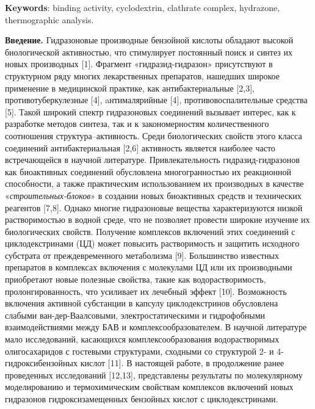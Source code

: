 {\bfseries Keywords}: binding activity, cyclodextrin, clathrate complex,
hydrazone, thermographic analysis.

\begin{multicols}{2}
{\bfseries Введение.} Гидразоновые производные бензойной кислоты обладают
высокой биологической активностью, что стимулирует постоянный поиск и
синтез их новых производных {[}1{]}. Фрагмент «гидразид-гидразон»
присутствуют в структурном ряду многих лекарственных препаратов,
нашедших широкое применение в медицинской практике, как
антибактериальные {[}2,3{]}, противотуберкулезные {[}4{]},
aнтималярийные {[}4{]}, противовоспалительные средства {[}5{]}. Такой
широкий спектр гидразоновых соединений вызывает интерес, как к
разработке методов синтеза, так и к закономерностям количественного
соотношения структура--активность. Среди биологических свойств этого
класса соединений антибактериальная {[}2,6{]} активность является
наиболее часто встречающейся в научной литературе. Привлекательность
гидразид-гидразонов как биоактивных соединений обусловлена
многогранностью их реакционной способности, а также практическим
использованием их производных в качестве «\emph{строительных-блоков}» в
создании новых биоактивных средств и технических реагентов {[}7,8{]}.
Однако многие гидразоновые вещества характеризуются низкой
растворимостью в водной среде, что не позволяет провести широкие
изучение их биологических свойств. Получение комплексов включений этих
соединений с циклодекстринами (ЦД) может повысить растворимость и
защитить исходного субстрата от преждевременного метаболизма {[}9{]}.
Большинство известных препаратов в комплексах включения с молекулами ЦД
или их производными приобретают новые полезные свойства, такие как
водорастворимость, пролонгированность, что усиливает их лечебный эффект
{[}10{]}. Возможность включения активной субстанции в капсулу
циклодекстринов обусловлена слабыми ван-дер-Ваалсовыми,
электростатическими и гидрофобными взаимодействиями между БАВ и
комплексообразователем. В научной литературе мало исследований,
касающихся комплексообразования водорастворимых олигосахаридов с
гостевыми структурами, сходными со структурой 2- и 4-гидроксибензойных
кислот {[}11{]}. В настоящей работе, в продолжение ранее проведенных
исследований {[}12,13{]}, представлены результаты по молекулярному
моделированию и термохимическим свойствам комплексов включений новых
гидразонов гидроксизамещенных бензойных кислот с циклодекстринами.


\end{multicols}
